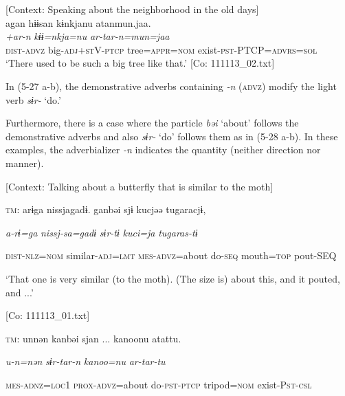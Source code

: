  \ex \label{ex:5:c} [Context: Speaking about the neighborhood in the old days]\\
\glll  agan  hɨɨsan  kɨnkjanu   atanmun.jaa.\\
      \textit{}  \textit{+ar-n}  \textit{kɨɨ=nkja=nu}   \textit{ar-tar-n=mun=jaa}\\                                                                  
      \textsc{dist}-\textsc{advz}  big-\textsc{adj}+\textsc{st}V-\textsc{ptcp}  tree=\textsc{appr}=\textsc{nom} exist-\textsc{pst}-PTCP=\textsc{advrs}=\textsc{sol}\\
\glt ‘There used to be such a big tree like that.’ [Co: 111113\_02.txt]
\z
\z

In (5-27 a-b), the demonstrative adverbs containing \textit{{}-n} (\textsc{advz}) modify the light verb \textit{sɨr-} ‘do.’

Furthermore, there is a case where the particle \textit{bəi} ‘about’ follows the demonstrative adverbs and also \textit{sɨr-} ‘do’ follows them as in (5-28 a-b). In these examples, the adverbializer \textit{{}-n} indicates the quantity (neither direction nor manner).

\ea \label{ex:5:28}  \ea \label{ex:5:28a} [Context: Talking about a butterfly that is similar to the moth]

    \textsc{tm}:  arɨga  nissjagadɨ.  ganbəi  sjɨ  kucjəə  tugaracjɨ,

      \textit{a-rɨ=ga}  \textit{nissj-sa=gadɨ}  \textit{}  \textit{sɨr-tɨ}  \textit{kuci=ja}  \textit{tugaras-tɨ}
                                                                                   
      \textsc{dist}-\textsc{nlz}=\textsc{nom}  similar-\textsc{adj}=\textsc{lmt}  \textsc{mes}-\textsc{advz}=about  do-\textsc{seq}     mouth=\textsc{top}  pout-SEQ

      ‘That one is very similar (to the moth). (The size is) about this, and it pouted, and ...’

      [Co: 111113\_01.txt]

 \ex \label{ex:5:28b} \textsc{tm}:  unnən  kanbəi  sjan  ...   kanoonu  atattu.
                                                               
      \textit{u-n=nən}  \textit{}  \textit{sɨr-tar-n} \textit{kanoo=nu}  \textit{ar-tar-tu}     
                                                              
      \textsc{mes}-\textsc{adnz}=\textsc{loc}1  \textsc{prox}-\textsc{advz}=about  do-\textsc{pst}-\textsc{ptcp}   tripod=\textsc{nom}  exist-P\textsc{st}-\textsc{csl}


